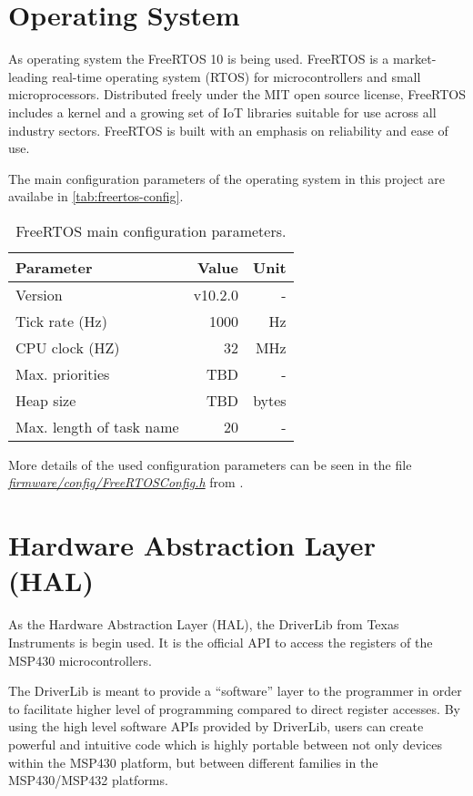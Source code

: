 \section{Operating System}

As operating system the FreeRTOS 10 \cite{freertos} is being used. FreeRTOS is a market-leading real-time operating system (RTOS) for microcontrollers and small microprocessors. Distributed freely under the MIT open source license, FreeRTOS includes a kernel and a growing set of IoT libraries suitable for use across all industry sectors. FreeRTOS is built with an emphasis on reliability and ease of use.

The main configuration parameters of the operating system in this project are availabe in \autoref{tab:freertos-config}.

\begin{table}[!h]
    \centering
    \begin{tabular}{lrr}
        \toprule[1.5pt]
        \textbf{Parameter}       & \textbf{Value} & \textbf{Unit} \\
        \midrule
        Version                  & v10.2.0        & - \\
        Tick rate (Hz)           & 1000           & Hz \\
        CPU clock (HZ)           & 32             & MHz \\
        Max. priorities          & TBD            & - \\
        Heap size                & TBD            & bytes \\
        Max. length of task name & 20             & - \\
        \bottomrule[1.5pt]
    \end{tabular}
    \caption{FreeRTOS main configuration parameters.}
    \label{tab:freertos-config}
\end{table}

More details of the used configuration parameters can be seen in the file \textit{\href{https://github.com/spacelab-ufsc/eps2/blob/master/firmware/config/FreeRTOSConfig.h}{firmware/config/FreeRTOSConfig.h}} from \cite{eps2}.

\section{Hardware Abstraction Layer (HAL)}

As the Hardware Abstraction Layer (HAL), the DriverLib \cite{driverlib} from Texas Instruments is begin used. It is the official API to access the registers of the MSP430 microcontrollers.

The DriverLib is meant to provide a ``software'' layer to the programmer in order to facilitate higher level of programming compared to direct register accesses. By using the high level software APIs provided by DriverLib, users can create powerful and intuitive code which is highly portable between not only devices within the MSP430 platform, but between different families in the MSP430/MSP432 platforms.